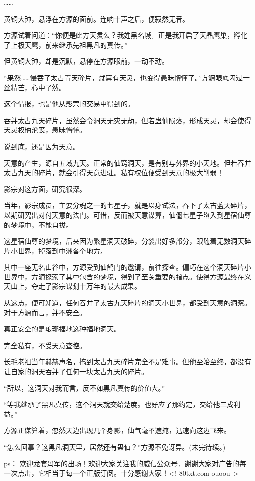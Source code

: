 \begin{this_body}
……

黄铜大钟，悬浮在方源的面前。连响十声之后，便寂然无音。

方源试着问道：“你便是此方天灵么？我姓黑名城，正是我开启了天晶鹰巢，孵化了上极天鹰，前来继承先祖黑凡的真传。”

但黄铜大钟，却是沉默，悬停在方源眼前，一动不动。

“果然……侵吞了太古青天碎片，就算有天灵，也变得愚昧懵懂了。”方源眼底闪过一丝精芒，心中了然。

这个情报，也是他从影宗的交易中得到的。

吞并太古九天碎片，虽然会令洞天无灾无劫，但若蛊仙陨落，形成天灵，却会使得天灵权柄沦丧，愚昧懵懂。

说到底，还是因为天意。

天意的产生，源自五域九天。正常的仙窍洞天，是有别与外界的小天地。但若吞并太古九天的碎片，就会引得天意进驻。私有权位便受到天意的极大削弱！

影宗对这方面，研究很深。

当年，影宗成员，主要分魂之一的七星子，就是以身试法，吞下了太古蓝天碎片，以期研究出对付天意的法门。可惜，反而被天意谋算，仙僵七星子陷入到星宿仙尊的梦境中，不能自拔。

这星宿仙尊的梦境，后来因为繁星洞天破碎，分裂出好多部分，跟随着无数洞天碎片小世界，掉落到中洲各个地方。

其中一座无名山谷中，方源受到仙鹤门的邀请，前往探查。偏巧在这个洞天碎片小世界中，方源探索了其中包含的梦境，得到了至关重要的指点。使得方源最终在义天山上，夺走了影宗谋划十万年的最大成果。

从这点，便可知道，任何吞并了太古九天碎片的洞天小世界，都受到天意的洞察。对于方源而言，并不安全。

真正安全的是琅琊福地这种福地洞天。

完全私有，不受天意查控。

长毛老祖当年赫赫声名，搞到太古九天碎片完全不是难事。但他至始至终，都没有让自家的洞天吞并了任何一块太古九天的碎片。

“所以，这洞天对我而言，反不如黑凡真传的价值大。”

“等我继承了黑凡真传，这个洞天就交给楚度。也好应了那约定，交给他三成利益。”

方源正谋算着，忽然天边出现几个身影，仙气毫不遮掩，迅速向这边飞来。

“怎么回事？这黑凡洞天里，居然还有蛊仙？”方源不免讶异。(未完待续。)

ps：    欢迎龙套冯军的出场！欢迎大家关注我的威信公众号，谢谢大家对广告的每一次点击，它相当于每一个正版订阅。十分感谢大家！<!--80txt.com-ouoou-->

\end{this_body}

